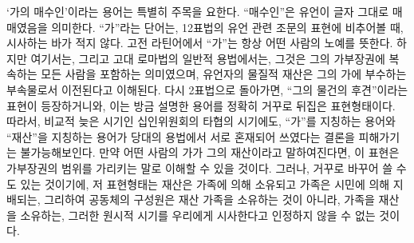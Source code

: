 `가의 매수인'이라는 용어는 특별히 주목을 요한다.
``매수인''은 유언이 글자 그대로 매매였음을 의미한다.
``가''라는 단어는,
12표법의 유언 관련 조문의 표현에 비추어볼 때,
시사하는 바가 적지 않다.
고전 라틴어에서 ``가''는 항상 어떤 사람의 노예를 뜻한다.
하지만 여기서는, 그리고 고대 로마법의 일반적 용법에서는,
그것은 그의 가부장권에 복속하는 모든 사람을 포함하는 의미였으며,
유언자의 물질적 재산은 그의 가에 부수하는 부속물로서
이전된다고 이해된다.
다시 2표법으로 돌아가면, ``그의 물건의 후견''이라는
표현이 등장하거니와, 이는 방금 설명한 용어를 정확히 거꾸로 뒤집은 표현형태이다.
따라서,
비교적 늦은 시기인
십인위원회의 타협의 시기에도,
``가''를 지칭하는 용어와 ``재산''을 지칭하는 용어가 당대의 용법에서
서로 혼재되어 쓰였다는
결론을 피해가기는 불가능해보인다.
만약 어떤 사람의 가가 그의 재산이라고 말하여진다면,
이 표현은 가부장권의 범위를 가리키는 말로 이해할 수 있을 것이다.
그러나, 거꾸로 바꾸어 쓸 수도 있는 것이기에,
저 표현형태는
재산은 가족에 의해 소유되고 가족은 시민에 의해 지배되는,
그리하여 공동체의 구성원은 재산 가족을 소유하는 것이 아니라,
가족을  재산을 소유하는,
그러한 원시적 시기를 우리에게 시사한다고
인정하지 않을 수 없는 것이다.

